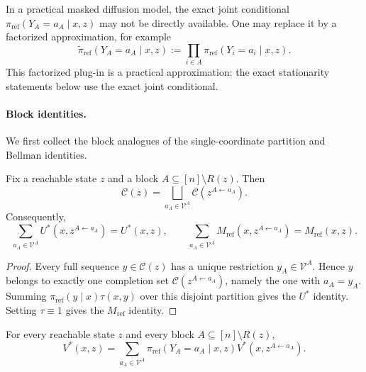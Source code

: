 \documentclass{article}
\numberwithin{theorem}{section}
\numberwithin{proposition}{section}
\numberwithin{corollary}{section}
\numberwithin{lemma}{section}
\numberwithin{conjecture}{section}
\numberwithin{remark}{section}
\numberwithin{definition}{section}
\numberwithin{assumption}{section}
\numberwithin{example}{section}
\newcommand{\calC}{{\mathcal{C}}}
\newcommand{\calV}{{\mathcal{V}}}
\newcommand{\lbra}[1]{\left[#1\right]}
\providecommand{\base}{\pi_{\mathrm{ref}}}
\begin{document}
\begin{remark}
In a practical masked diffusion model, the exact joint conditional $\base(Y_A=a_A\mid x,z)$ may not be directly available. One may replace it by a factorized approximation, for example
\begin{equation*}
    \widetilde\base(Y_A=a_A\mid x,z):=\prod_{i\in A}\base(Y_i=a_i\mid x,z).
\end{equation*}
This factorized plug-in is a practical approximation: the exact stationarity statements below use the exact joint conditional.
\end{remark}

\paragraph{Block identities.}

We first collect the block analogues of the single-coordinate partition and Bellman identities.

\begin{lemma}
\label{lem:balanced_mdm_partition}
Fix a reachable state $z$ and a block $A\subseteq\lbra{n}\setminus R(z)$. Then
\begin{equation*}
    \calC(z)=\bigsqcup_{a_A\in\calV^A}\calC(z^{A\leftarrow a_A}).
\end{equation*}
Consequently,
\begin{equation*}
    \sum_{a_A\in\calV^A}U^*(x,z^{A\leftarrow a_A})=U^*(x,z),\qquad
    \sum_{a_A\in\calV^A}M_{\mathrm{ref}}(x,z^{A\leftarrow a_A})=M_{\mathrm{ref}}(x,z).
\end{equation*}
\end{lemma}

\begin{proof}
Every full sequence $y\in\calC(z)$ has a unique restriction $y_A\in\calV^A$. Hence $y$ belongs to exactly one completion set $\calC(z^{A\leftarrow a_A})$, namely the one with $a_A=y_A$. Summing $\base(y\mid x)\tau(x,y)$ over this disjoint partition gives the $U^*$ identity. Setting $\tau\equiv1$ gives the $M_{\mathrm{ref}}$ identity.
\end{proof}

\begin{proposition}
\label{prop:balanced_mdm_bellman}
For every reachable state $z$ and every block $A\subseteq\lbra{n}\setminus R(z)$,
\begin{equation*}
    V^*(x,z)=\sum_{a_A\in\calV^A}\base(Y_A=a_A\mid x,z)V^*(x,z^{A\leftarrow a_A}).
\end{equation*}
\end{proposition}
\end{document}
